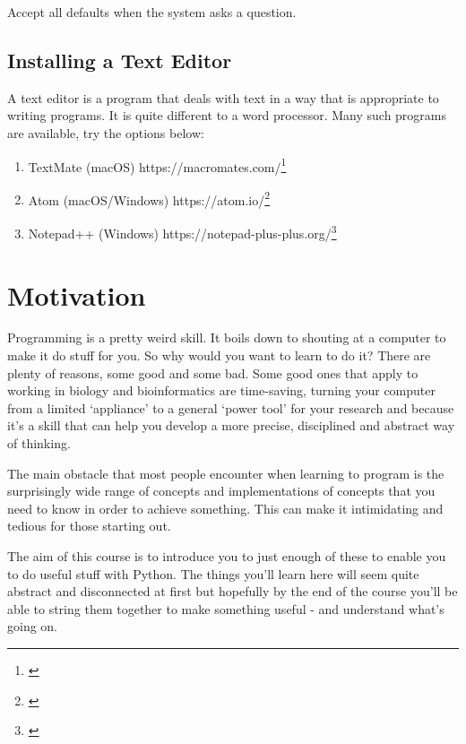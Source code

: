 \documentclass[]{book}
\providecommand{\tightlist}{%
  \setlength{\itemsep}{0pt}\setlength{\parskip}{0pt}}
\let\rmarkdownfootnote\footnote%
\def\footnote{\protect\rmarkdownfootnote}
\renewcommand{\href}[2]{#2\footnote{\url{#1}}}
\theoremstyle{definition}
\theoremstyle{definition}
\theoremstyle{definition}
\theoremstyle{remark}
\begin{document}
Accept all defaults when the system asks a question.

\hypertarget{installing-a-text-editor}{%
\section{Installing a Text Editor}\label{installing-a-text-editor}}

A text editor is a program that deals with text in a way that is
appropriate to writing programs. It is quite different to a word
processor. Many such programs are available, try the options below:

\begin{enumerate}
\def\labelenumi{\arabic{enumi}.}
\tightlist
\item
  TextMate (macOS) \href{}{https://macromates.com/}
\item
  Atom (macOS/Windows) \href{}{https://atom.io/}
\item
  Notepad++ (Windows) \href{}{https://notepad-plus-plus.org/}
\end{enumerate}

\hypertarget{motivation}{%
\chapter{Motivation}\label{motivation}}

Programming is a pretty weird skill. It boils down to shouting at a
computer to make it do stuff for you. So why would you want to learn to
do it? There are plenty of reasons, some good and some bad. Some good
ones that apply to working in biology and bioinformatics are
time-saving, turning your computer from a limited `appliance' to a
general `power tool' for your research and because it's a skill that can
help you develop a more precise, disciplined and abstract way of
thinking.

The main obstacle that most people encounter when learning to program is
the surprisingly wide range of concepts and implementations of concepts
that you need to know in order to achieve something. This can make it
intimidating and tedious for those starting out.

The aim of this course is to introduce you to just enough of these to
enable you to do useful stuff with Python. The things you'll learn here
will seem quite abstract and disconnected at first but hopefully by the
end of the course you'll be able to string them together to make
something useful - and understand what's going on.
\end{document}
